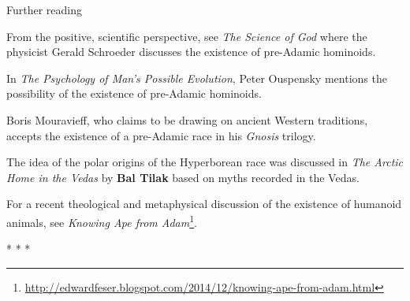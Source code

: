 \hfill

Further reading

From the positive, scientific perspective, see \emph{The Science of God} where the physicist Gerald Schroeder discusses the existence of pre-Adamic hominoids.

In \emph{The Psychology of Man's Possible Evolution}, Peter Ouspensky mentions the possibility of the existence of pre-Adamic hominoids.

Boris Mouravieff, who claims to be drawing on ancient Western traditions, accepts the existence of a pre-Adamic race in his \emph{Gnosis} trilogy.

The idea of the polar origins of the Hyperborean race was discussed in \emph{The Arctic Home in the Vedas} by \textbf{Bal Tilak} based on myths recorded in the Vedas.

For a recent theological and metaphysical discussion of the existence of humanoid animals, see \textit{Knowing Ape from Adam}\footnote{\url{http://edwardfeser.blogspot.com/2014/12/knowing-ape-from-adam.html}}.




\begin{center}* * *\end{center}

